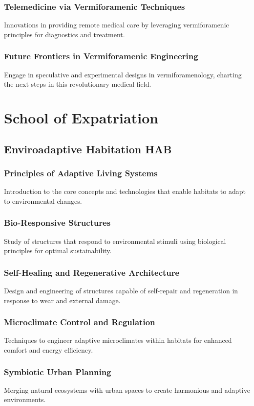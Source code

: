 \subsubsection{Telemedicine via Vermiforamenic Techniques}
Innovations in providing remote medical care by leveraging vermiforamenic principles for diagnostics and treatment.
\subsubsection{Future Frontiers in Vermiforamenic Engineering}
Engage in speculative and experimental designs in vermiforamenology, charting the next steps in this revolutionary medical field.


\section{School of Expatriation}


\subsection{Enviroadaptive Habitation \hfill HAB}
\subsubsection{Principles of Adaptive Living Systems}
Introduction to the core concepts and technologies that enable habitats to adapt to environmental changes.
\subsubsection{Bio-Responsive Structures}
Study of structures that respond to environmental stimuli using biological principles for optimal sustainability.
\subsubsection{Self-Healing and Regenerative Architecture}
Design and engineering of structures capable of self-repair and regeneration in response to wear and external damage.
\subsubsection{Microclimate Control and Regulation}
Techniques to engineer adaptive microclimates within habitats for enhanced comfort and energy efficiency.
\subsubsection{Symbiotic Urban Planning}
Merging natural ecosystems with urban spaces to create harmonious and adaptive environments.
